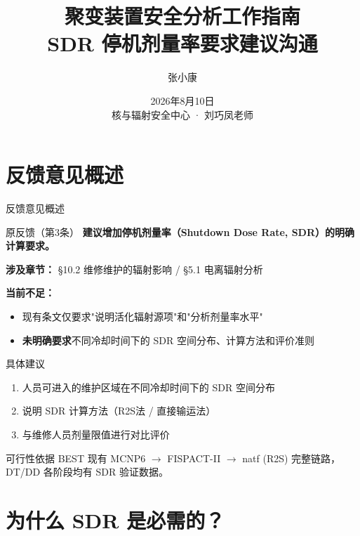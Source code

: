 \documentclass[aspectratio=169]{ctexbeamer}
\title{聚变装置安全分析工作指南 \\ SDR 停机剂量率要求建议沟通}
\author{张小康}
\institute{中国科学院等离子体物理研究所}
\date{2026年8月10日 \\ 核与辐射安全中心 · 刘巧凤老师}
\begin{document}
\frame{\titlepage}

\section{反馈意见概述}

\begin{frame}{反馈意见概述}
	\begin{block}{原反馈（第3条）}
		\textbf{建议增加停机剂量率（Shutdown Dose Rate, SDR）的明确计算要求。}
	\end{block}
	\vspace{4pt}
	\textbf{涉及章节：} §10.2 维修维护的辐射影响 / §5.1 电离辐射分析

	\vspace{8pt}
	\textbf{当前不足：}
	\begin{itemize}
		\item 现有条文仅要求"说明活化辐射源项"和"分析剂量率水平"
		\item \textbf{未明确要求}不同冷却时间下的 SDR 空间分布、计算方法和评价准则
	\end{itemize}
\end{frame}

\begin{frame}{具体建议}
	\begin{enumerate}
		\item[(a)] 人员可进入的维护区域在不同冷却时间下的 SDR 空间分布
		\item[(b)] 说明 SDR 计算方法（R2S法 / 直接输运法）
		\item[(c)] 与维修人员剂量限值进行对比评价
	\end{enumerate}

	\vspace{12pt}
	\begin{block}{可行性依据}
		BEST 现有 MCNP6 $\to$ FISPACT-II $\to$ natf (R2S) 完整链路，DT/DD 各阶段均有 SDR 验证数据。
	\end{block}
\end{frame}

\section{为什么 SDR 是必需的？}
\end{document}
